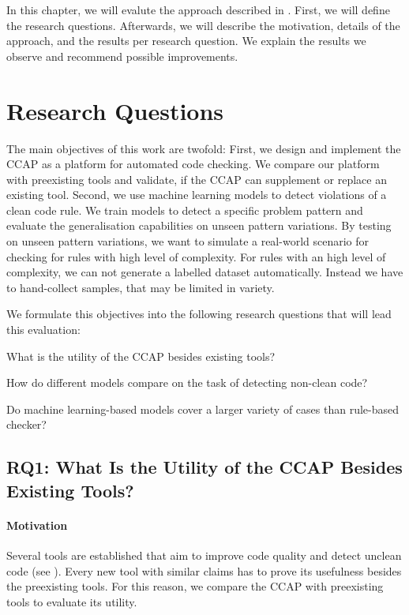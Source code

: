 In this chapter, we will evalute the approach described in . First, we will define the research questions. Afterwards, we will describe the motivation, details of the approach, and the results per research question. We explain the results we observe and recommend possible improvements.

\section{Research Questions}
The main objectives of this work are twofold: First, we design and implement the CCAP as a platform for automated code checking. We compare our platform with preexisting tools and validate, if the CCAP can supplement or replace an existing tool. 
Second, we use machine learning models to detect violations of a clean code rule. We train models to detect a specific problem pattern and evaluate the generalisation capabilities on unseen pattern variations. By testing on unseen pattern variations, we want to simulate a real-world scenario for checking for rules with high level of complexity. For rules with an high level of complexity, we can not generate a labelled dataset automatically. Instead we have to hand-collect samples, that may be limited in variety.

We formulate this objectives into the following research questions that will lead this evaluation:
\begin{description}
    \setlength{\itemsep}{1pt}
    \item[RQ1]What is the utility of the CCAP besides existing tools? 
    \item[RQ2]How do different models compare on the task of detecting non-clean code?
    \item[RQ3]Do machine learning-based models cover a larger variety of cases than rule-based checker? 
\end{description}

\subsection{RQ1: What Is the Utility of the CCAP Besides Existing Tools?}
\paragraph{Motivation}
Several tools are established that aim to improve code quality and detect unclean code (see ). Every new tool with similar claims has to prove its usefulness besides the preexisting tools. For this reason, we compare the CCAP with preexisting tools to evaluate its utility.

